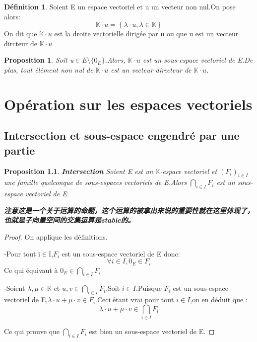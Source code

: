 \documentclass[12pt]{book}
\theoremstyle{definition}\newtheorem{dfn}{Définition}[chapter]
\theoremstyle{plain}\newtheorem{thm}{Théorème}[chapter]
\theoremstyle{plain}\newtheorem{prp}{Proposition}[chapter]
\theoremstyle{plain}\newtheorem{lem}{\bf Lemme}[chapter]
\theoremstyle{plain}\newtheorem{axm}{\bf Axiome}[chapter]
\theoremstyle{plain}\newtheorem{lmm}{\bf Lemme}[chapter]
\theoremstyle{plain}\newtheorem{cor}{\bf Corollaire}[chapter]
\theoremstyle{remark}\newtheorem{rem}{Remarque}[chapter]
\begin{document}
\begin{dfn}
        Soient E un espace vectoriel et u un vecteur non nul.On pose alors:
        $$
        \mathbb{K}\cdot u=\left \{ \lambda\cdot u, \lambda\in \mathbb{K} \right \}
        $$
        On dit que $\mathbb{K}\cdot u$ est la droite vectorielle dirigée par u ou que u est un vecteur dircteur de $\mathbb{K}\cdot u$
\end{dfn}
\begin{prp}
        Soit u$\in E\setminus{\{ 0_E\}}$.Alors,    $\mathbb{K}\cdot u$ est un sous-espace vectoriel de E.De plus, tout élément non nul de $\mathbb{K}\cdot u$ est un vecteur directeur de $\mathbb{K}\cdot u$.
\end{prp}






















\chapter{Opération sur les espaces vectoriels}
\section{Intersection et sous-espace engendré par une partie}

\begin{prp}{\bf Intersection}
   Soient E est un $\mathbb{K}$-espace vectoriel et $(F_i)_{i \in I}$ une famille quelconque de sous-espaces vectoriels de E.Alors  $\bigcap_{i \in I}F_{i}$ est un sous-espace vectoriel de E.

\textbf{注意这是一个关于运算的命题，这个运算的被拿出来说的重要性就在这里体现了，也就是子向量空间的交集运算是stable的。}
\end{prp}

\begin{proof}
        On applique les définitions.

        -Pour tout i$\in$I,$F_i$ est un sous-espace vectoriel de E donc:
        $$
        \forall i\in I,0_E\in F_i
        $$
        Ce qui équivaut à $0_E\in\bigcap_{i\in I}F_i$

        -Soient $\lambda,\mu\in \mathbb{K}$ et $u,v \in\bigcap_{i\in I}F_i$.Soit $i \in I$.Puisque $F_i$ est un sous-espace vectoriel de E,$\lambda\cdot u+\mu\cdot v\in F_i$.Ceci étant vrai pour tout $i\in I$,on en déduit que :
$$
\lambda\cdot u+\mu\cdot v\in\bigcap_{i\in I}F_i
$$

Ce qui prouve que $\bigcap_{i\in I}F_i$  est bien un sous-espace vectoriel de E.
\end{proof}
\end{document}
